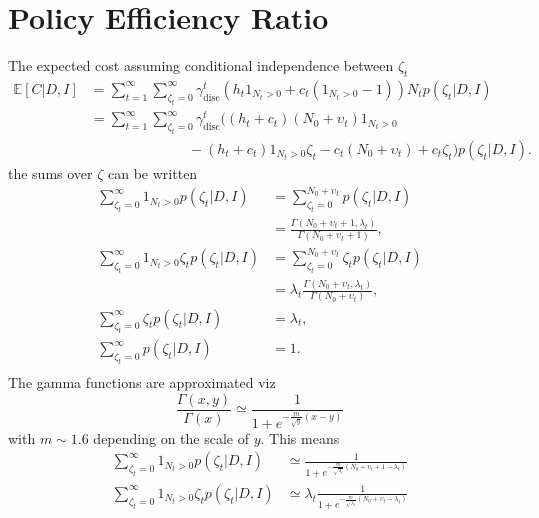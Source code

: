 \section{Policy Efficiency Ratio}
\label{app:cer}
The expected cost assuming conditional independence between $\zeta_t$
\begin{equation}
	\begin{split}
		\mathbb{E}[C|D,I] &= \sum_{t=1}^{\infty}\sum_{\zeta_t=0}^\infty \gamma_{\text{disc}}^{t} \left( h_t 1_{N_t> 0} + c_t (1_{N_t> 0}-1) \right)N_tp(\zeta_t| D, I)\\
		&= \sum_{t=1}^{\infty}\sum_{\zeta_t=0}^\infty \gamma_{\text{disc}}^{t} \bigg( 
		(h_t+c_t)(N_0 + \upsilon_t)1_{N_t> 0}\\
		&\qquad\qquad\qquad\quad-(h_t+c_t) 1_{N_t> 0}\zeta_t
		- c_t(N_0 + \upsilon_t)+c_t\zeta_t\bigg)p(\zeta_t| D, I).
	\end{split}
\end{equation}
the sums over $\zeta$ can be written
\begin{equation}
	\begin{split}
		\sum_{\zeta_t=0}^\infty1_{N_t> 0}p(\zeta_t| D, I) & = \sum_{\zeta_t=0}^{N_0+\upsilon_t} p(\zeta_t| D, I)\\
		&= \frac{\Gamma(N_0+\upsilon_t+1,\lambda_t)}{\Gamma(N_0+\upsilon_t+1)},\\
		\sum_{\zeta_t=0}^\infty1_{N_t> 0}\zeta_tp(\zeta_t| D, I) & = \sum_{\zeta_t=0}^{N_0+\upsilon_t} \zeta_t p(\zeta_t| D, I)\\
		& = \lambda_t \frac{\Gamma(N_0+\upsilon_t,\lambda_t)}{\Gamma(N_0+\upsilon_t)},\\
		\sum_{\zeta_t=0}^\infty\zeta_tp(\zeta_t| D, I) & = \lambda_t,\\
		\sum_{\zeta_t=0}^\infty p(\zeta_t| D, I) & = 1.\\
	\end{split}
\end{equation}
The gamma functions are approximated viz~\cite{bartmann1992inventory}
\begin{equation}
	\frac{\Gamma(x,y)}{\Gamma(x)}\simeq \frac{1}{1+e^{-\frac{m}{\sqrt{y}}(x-y)}}
\end{equation}
with $m\sim 1.6$ depending on the scale of $y$. This means
\begin{equation}
	\begin{split}
		\sum_{\zeta_t=0}^\infty1_{N_t> 0}p(\zeta_t| D, I) & \simeq \frac{1}{1+e^{-\frac{m}{\sqrt{\lambda_t}}(N_0+\upsilon_t+1-\lambda_t)}}\\
		\sum_{\zeta_t=0}^\infty1_{N_t> 0}\zeta_tp(\zeta_t| D, I) & \simeq \lambda_t\frac{1}{1+e^{-\frac{m}{\sqrt{\lambda_t}}(N_0+\upsilon_t-\lambda_t)}}\\
	\end{split}
\end{equation}
